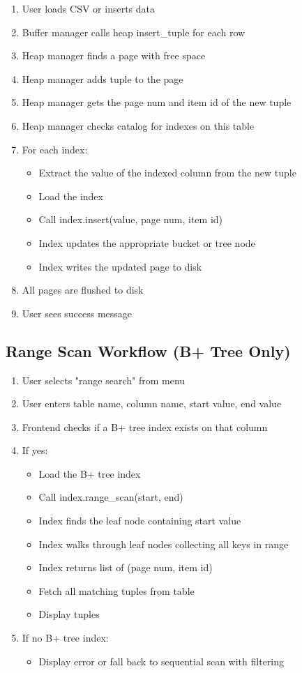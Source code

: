 \documentclass[11pt,a4paper]{article}
\begin{document}
\begin{enumerate}
\item User loads CSV or inserts data
\item Buffer manager calls heap insert\_tuple for each row
\item Heap manager finds a page with free space
\item Heap manager adds tuple to the page
\item Heap manager gets the page num and item id of the new tuple
\item Heap manager checks catalog for indexes on this table
\item For each index:
    \begin{itemize}
    \item Extract the value of the indexed column from the new tuple
    \item Load the index
    \item Call index.insert(value, page num, item id)
    \item Index updates the appropriate bucket or tree node
    \item Index writes the updated page to disk
    \end{itemize}
\item All pages are flushed to disk
\item User sees success message
\end{enumerate}

\subsection{Range Scan Workflow (B+ Tree Only)}

\begin{enumerate}
\item User selects "range search" from menu
\item User enters table name, column name, start value, end value
\item Frontend checks if a B+ tree index exists on that column
\item If yes:
    \begin{itemize}
    \item Load the B+ tree index
    \item Call index.range\_scan(start, end)
    \item Index finds the leaf node containing start value
    \item Index walks through leaf nodes collecting all keys in range
    \item Index returns list of (page num, item id)
    \item Fetch all matching tuples from table
    \item Display tuples
    \end{itemize}
\item If no B+ tree index:
    \begin{itemize}
    \item Display error or fall back to sequential scan with filtering
    \end{itemize}
\end{enumerate}
\end{document}
